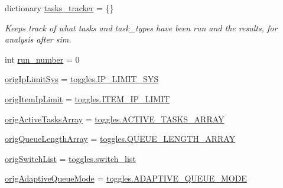 \begin{DoxyCompactItemize}
\item 
dictionary \hyperlink{classdynamicfilterapp_1_1test__simulations_1_1_simulation_test_a67cf55043194c793829d5854b43541ce}{tasks\+\_\+tracker} = \{\}
\begin{DoxyCompactList}\small\item\em Keeps track of what tasks and task\+\_\+types have been run and the results, for analysis after sim. \end{DoxyCompactList}\item 
int \hyperlink{classdynamicfilterapp_1_1test__simulations_1_1_simulation_test_a67ae879ef816bba6f12cf79a61bf2679}{run\+\_\+number} = 0
\item 
\hyperlink{classdynamicfilterapp_1_1test__simulations_1_1_simulation_test_adc00619d9e66b05d4ac5582196ec80be}{orig\+Ip\+Limit\+Sys} = \hyperlink{namespacedynamicfilterapp_1_1toggles_ab27926159525360b29661a4778b0ce7c}{toggles.\+I\+P\+\_\+\+L\+I\+M\+I\+T\+\_\+\+S\+YS}
\item 
\hyperlink{classdynamicfilterapp_1_1test__simulations_1_1_simulation_test_ab5c215fde31205b8506243914232f390}{orig\+Item\+Ip\+Limit} = \hyperlink{namespacedynamicfilterapp_1_1toggles_a755f2e9edbb8b4d5039a950757b9cfb2}{toggles.\+I\+T\+E\+M\+\_\+\+I\+P\+\_\+\+L\+I\+M\+IT}
\item 
\hyperlink{classdynamicfilterapp_1_1test__simulations_1_1_simulation_test_ac030528ad5237a1990830e18364573c4}{orig\+Active\+Tasks\+Array} = \hyperlink{namespacedynamicfilterapp_1_1toggles_a8f7b1e7beea29c74a7defab7d44ef294}{toggles.\+A\+C\+T\+I\+V\+E\+\_\+\+T\+A\+S\+K\+S\+\_\+\+A\+R\+R\+AY}
\item 
\hyperlink{classdynamicfilterapp_1_1test__simulations_1_1_simulation_test_a0a3b1ef73590c0b36a223ffac390c76e}{orig\+Queue\+Length\+Array} = \hyperlink{namespacedynamicfilterapp_1_1toggles_af8d4fe75258dd9f8b4c8cdb1b5b68ad1}{toggles.\+Q\+U\+E\+U\+E\+\_\+\+L\+E\+N\+G\+T\+H\+\_\+\+A\+R\+R\+AY}
\item 
\hyperlink{classdynamicfilterapp_1_1test__simulations_1_1_simulation_test_ab4075fb87bbe6b7e7b5b846be6c75098}{orig\+Switch\+List} = \hyperlink{namespacedynamicfilterapp_1_1toggles_abbafede9e00a5523a3cfea9fc4ff4764}{toggles.\+switch\+\_\+list}
\item 
\hyperlink{classdynamicfilterapp_1_1test__simulations_1_1_simulation_test_adc5ea4c560f297ad52d4bad2ff3aba68}{orig\+Adaptive\+Queue\+Mode} = \hyperlink{namespacedynamicfilterapp_1_1toggles_ae5f3a5957b65dd5d074c52ef01e0f732}{toggles.\+A\+D\+A\+P\+T\+I\+V\+E\+\_\+\+Q\+U\+E\+U\+E\+\_\+\+M\+O\+DE}
\item 

\end{DoxyCompactItemize}
